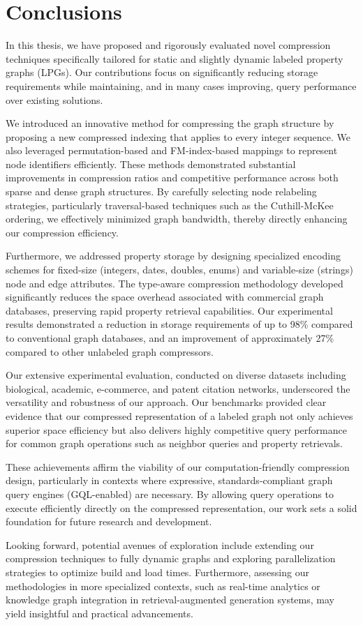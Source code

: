 \chapter{Conclusions}

In this thesis, we have proposed and rigorously evaluated novel compression techniques specifically tailored for static and slightly dynamic labeled property graphs (LPGs). Our contributions focus on significantly reducing storage requirements while maintaining, and in many cases improving, query performance over existing solutions.

We introduced an innovative method for compressing the graph structure by proposing a new compressed indexing that applies to every integer sequence. We also leveraged permutation-based and FM-index-based mappings to represent node identifiers efficiently. These methods demonstrated substantial improvements in compression ratios and competitive performance across both sparse and dense graph structures. By carefully selecting node relabeling strategies, particularly traversal-based techniques such as the Cuthill-McKee ordering, we effectively minimized graph bandwidth, thereby directly enhancing our compression efficiency.

Furthermore, we addressed property storage by designing specialized encoding schemes for fixed-size (integers, dates, doubles, enums) and variable-size (strings) node and edge attributes. The type-aware compression methodology developed significantly reduces the space overhead associated with commercial graph databases, preserving rapid property retrieval capabilities. Our experimental results demonstrated a reduction in storage requirements of up to 98\% compared to conventional graph databases, and an improvement of approximately 27\% compared to other unlabeled graph compressors.

Our extensive experimental evaluation, conducted on diverse datasets including biological, academic, e-commerce, and patent citation networks, underscored the versatility and robustness of our approach. Our benchmarks provided clear evidence that our compressed representation of a labeled graph not only achieves superior space efficiency but also delivers highly competitive query performance for common graph operations such as neighbor queries and property retrievals.

These achievements affirm the viability of our computation-friendly compression design, particularly in contexts where expressive, standards-compliant graph query engines (GQL-enabled) are necessary. By allowing query operations to execute efficiently directly on the compressed representation, our work sets a solid foundation for future research and development.

Looking forward, potential avenues of exploration include extending our compression techniques to fully dynamic graphs and exploring parallelization strategies to optimize build and load times. Furthermore, assessing our methodologies in more specialized contexts, such as real-time analytics or knowledge graph integration in retrieval-augmented generation systems, may yield insightful and practical advancements.